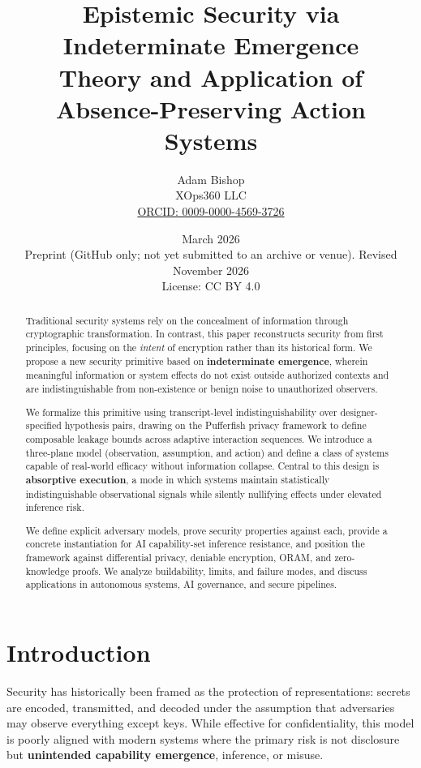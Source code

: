 \documentclass[11pt,a4paper]{article}
\title{%
  \textbf{Epistemic Security via Indeterminate Emergence}\\[0.3em]
  \Large Theory and Application of Absence-Preserving Action Systems
}
\author{%
  Adam Bishop\\
  XOps360 LLC\\
  \href{https://orcid.org/0009-0000-4569-3726}{ORCID: 0009-0000-4569-3726}
}
\date{March 2026\\[0.5em]\small Preprint (GitHub only; not yet submitted to an archive or venue). Revised November 2026\\
\small License: CC BY 4.0}
\begin{document}
\maketitle
\thispagestyle{fancy}

\begin{abstract}
Traditional security systems rely on the concealment of information through cryptographic transformation. In contrast, this paper reconstructs security from first principles, focusing on the \textit{intent} of encryption rather than its historical form. We propose a new security primitive based on \textbf{indeterminate emergence}, wherein meaningful information or system effects do not exist outside authorized contexts and are indistinguishable from non-existence or benign noise to unauthorized observers.

We formalize this primitive using transcript-level indistinguishability over designer-specified hypothesis pairs, drawing on the Pufferfish privacy framework to define composable leakage bounds across adaptive interaction sequences. We introduce a three-plane model (observation, assumption, and action) and define a class of systems capable of real-world efficacy without information collapse. Central to this design is \textbf{absorptive execution}, a mode in which systems maintain statistically indistinguishable observational signals while silently nullifying effects under elevated inference risk.

We define explicit adversary models, prove security properties against each, provide a concrete instantiation for AI capability-set inference resistance, and position the framework against differential privacy, deniable encryption, ORAM, and zero-knowledge proofs. We analyze buildability, limits, and failure modes, and discuss applications in autonomous systems, AI governance, and secure pipelines.
\end{abstract}

\section{Introduction}

Security has historically been framed as the protection of representations: secrets are encoded, transmitted, and decoded under the assumption that adversaries may observe everything except keys. While effective for confidentiality, this model is poorly aligned with modern systems where the primary risk is not disclosure but \textbf{unintended capability emergence}, inference, or misuse.
\end{document}
